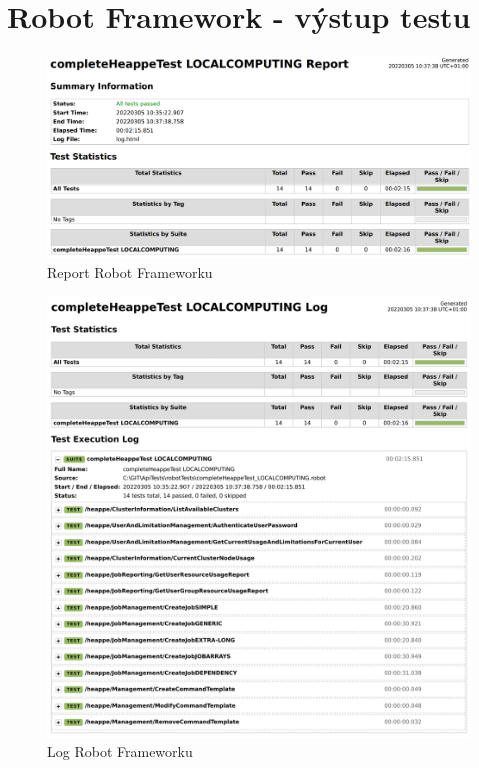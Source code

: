 \chapter{Robot Framework - výstup testu}\label{chapter:robot-framework-local-tests}

\begin{figure}[!h]
	\centering
	\includegraphics[width=1\textwidth]{Figures/robot-report.png}
	\caption{Report Robot Frameworku}
    \label{fig:robotFrameworkReport}
\end{figure}

\begin{figure}[!h]
	\centering
	\includegraphics[width=1\textwidth]{Figures/robot-log.png}
	\caption{Log Robot Frameworku}
    \label{fig:robotFrameworkLog}
\end{figure}


